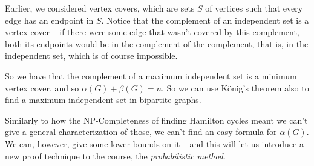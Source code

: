 \documentclass[nobib]{tufte-handout}
\begin{document}
\begin{remark}
    Earlier, we considered vertex covers, which are sets $S$ of vertices such that every edge has an endpoint in $S$. Notice that the complement of an independent set is a vertex cover -- if there were some edge that wasn't covered by this complement, both its endpoints would be in the complement of the complement, that is, in the independent set, which is of course impossible.

    So we have that the complement of a maximum independent set is a minimum vertex cover, and so $\alpha(G) + \beta(G) = n$. So we can use König's theorem also to find a maximum independent set in bipartite graphs.
\end{remark}

Similarly to how the NP-Completeness of finding Hamilton cycles meant we can't give a general characterization of those, we can't find an easy formula for $\alpha(G)$. We can, however, give some lower bounds on it -- and this will let us introduce a new proof technique to the course, the \emph{probabilistic method}.
\end{document}
